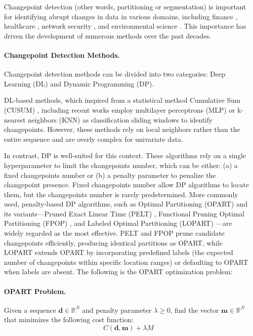 \documentclass[12pt]{article}
\begin{document}
Changepoint detection (other words, partitioning or segmentation) is important for identifying abrupt changes in data in various domains, including finance \citep{app:finance}, healthcare \citep{cancer}, network security \citep{app:network}, and environmental science \citep{app:climate}. This importance has driven the development of numerous methods over the past decades.

\paragraph{Changepoint Detection Methods.}
Changepoint detection methods can be divided into two categories: Deep Learning (DL) and Dynamic Programming (DP).
 
DL-based methods, which inspired from a statistical method Cumulative Sum (CUSUM) \citep{review:cusum, review:james1987tests}, including recent works \citep{review:li24automatic, review:ermshaus2023clasp} employ multilayer perceptrons (MLP) or k-nearest neighbors (KNN) as classification sliding windows to identify changepoints. 
However, these methods rely on local neighbors rather than the entire sequence and are overly complex for univariate data.

In contrast, DP is well-suited for this context.
These algorithms rely on a single hyperparameter to limit the changepoints number, which can be either: (a) a fixed changepoints number or (b) a penalty parameter to penalize the changepoint presence.
Fixed changepoints number allow DP algorithms \citep{review:binseg, review:bai2003computation, pelt, rigaill2015pruned} to locate them, but the changepoints number is rarely predetermined.
More commonly used, penalty-based DP algorithms, such as Optimal Partitioning (OPART) \citep{jackson:05} and its variants—Pruned Exact Linear Time (PELT) \citep{pelt}, Functional Pruning Optimal Partitioning (FPOP) \citep{fpop}, and Labeled Optimal Partitioning (LOPART) \citep{lopart}—are widely regarded as the most effective.
PELT and FPOP prune candidate changepoints efficiently, producing identical partitions as OPART, while LOPART extends OPART by incorporating predefined labels (the expected number of changepoints within specific location ranges) or defaulting to OPART when labels are absent.
The following is the OPART optimization problem:

\paragraph{OPART Problem.} Given a sequence $\mathbf{d} \in \mathbb{R}^N$ and penalty parameter $\lambda \geq 0$,
find the vector $\mathbf{m} \in \mathbb{R}^N$ that minimizes the following cost function:
\begin{equation*} \label{eq:opart_loss}
C(\textbf{d}, \textbf{m}) + \lambda M
\end{equation*}
\end{document}
